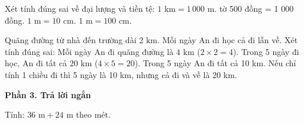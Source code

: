 \begin{ex} %
Xét tính đúng sai về đại lượng và tiền tệ:
\choiceTF
{\True $1\text{ km} = 1\,000\text{ m}$.}
{ tờ 500 đồng = 1 000 đồng.}
{$1\text{ m} = 10\text{ cm}$.}
{\True $1\text{ m} = 100\text{ cm}$.}
\end{ex}

\begin{ex} %
Quãng đường từ nhà đến trường dài $2\text{ km}$. Mỗi ngày An đi học cả đi lẫn về. Xét tính đúng sai:
\choiceTF
{\True Mỗi ngày An đi quãng đường là $4\text{ km}$ ($2 \times 2 = 4$).}
{\True Trong 5 ngày đi học, An đi tất cả $20\text{ km}$ ($4 \times 5 = 20$).}
{Trong 5 ngày An đi tất cả 10 km.}
{\True Nếu chỉ tính 1 chiều đi thì 5 ngày là 10 km, nhưng cả đi và về là 20 km.}
\end{ex}

\textbf{Phần 3. Trả lời ngắn}

\begin{ex} %
Tính: $36\text{ m} + 24\text{ m}$ theo mét.
\end{ex}

